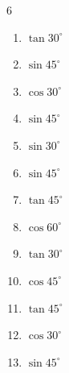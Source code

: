 \begin{multicols}{6}
\begin{enumerate}
  \item $\displaystyle \tan{30^\circ}$


  \item $\displaystyle \sin{45^\circ}$


  \item $\displaystyle \cos{30^\circ}$


  \item $\displaystyle \sin{45^\circ}$


  \item $\displaystyle \sin{30^\circ}$


  \item $\displaystyle \sin{45^\circ}$


  \item $\displaystyle \tan{45^\circ}$

        \phantom{$\displaystyle =1$}

  \item $\displaystyle \cos{60^\circ}$


  \item $\displaystyle \tan{30^\circ}$


  \item $\displaystyle \cos{45^\circ}$


  \item $\displaystyle \tan{45^\circ}$

        \phantom{$\displaystyle =1$}

  \item $\displaystyle \cos{30^\circ}$


  \item $\displaystyle \sin{45^\circ}$


\end{enumerate}
\end{multicols}
